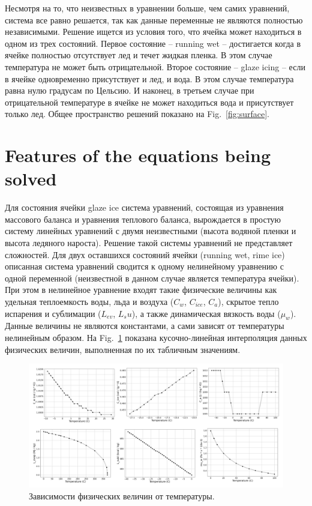 \documentclass[
11pt,%
tightenlines,%
twoside,%
onecolumn,%
nofloats,%
nobibnotes,%
nofootinbib,%
superscriptaddress,%
noshowpacs,%
centertags]%
{revtex4}
\begin{document}
Несмотря на то, что неизвестных в уравнении больше, чем самих уравнений, система все равно решается, так как данные переменные не являются полностью независимыми.
Решение ищется из условия того, что ячейка может находиться в одном из трех состояний.
Первое состояние -- running wet -- достигается когда в ячейке полностью отсутствует лед и течет жидкая пленка.
В этом случае температура не может быть отрицательной.
Второе состояние -- glaze icing -- если в ячейке одновременно присутствует и лед, и вода.
В этом случае температура равна нулю градусам по Цельсию.
И наконец, в третьем случае при отрицательной температуре в ячейке не может находиться вода и присутствует только лед.
Общее пространство решений показано на Fig.~\ref{fig:surface}.

\section{Features of the equations being solved}

Для состояния ячейки glaze ice система уравнений, состоящая из уравнения массового баланса и уравнения теплового баланса, вырождается в простую систему линейных уравнений с двумя неизвестными (высота водяной пленки и высота ледяного нароста).
Решение такой системы уравнений не представляет сложностей.
Для двух оставшихся состояний ячейки (running wet, rime ice) описанная система уравнений сводится к одному нелинейному уравнению с одной переменной (неизвестной в данном случае является температура ячейки).
При этом в нелинейное уравнение входят такие физические величины как удельная теплоемкость воды, льда и воздуха ($C_w$, $C_{ice}$, $C_a$), скрытое тепло испарения и сублимации ($L_{ev}$, $L_su$), а также динамическая вязкость воды ($\mu_w$).
Данные величины не являются константами, а сами зависят от температуры нелинейным образом.
На Fig.~\ref{fig:ph_graphics_h} показана кусочно-линейная интерполяция данных физических величин, выполненная по их табличным значениям.

\begin{figure}[h]
\setcaptionmargin{5mm}
\onelinecaptionstrue
\includegraphics[width=1.0\textwidth]{pics/ph_graphics_h.pdf}
\caption{Зависимости физических величин от температуры.}\label{fig:ph_graphics_h}
\end{figure}
\end{document}
